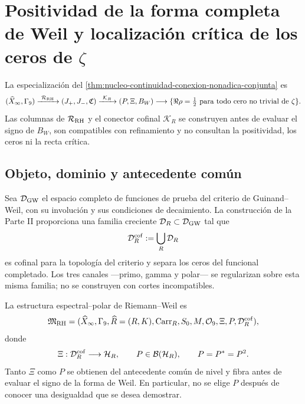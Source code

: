 \chapter[Positividad de Weil y localización crítica de los ceros de zeta]{Positividad de la forma completa de Weil y localización crítica de los ceros de \texorpdfstring{\(\zeta\)}{zeta}}

\noindent La especialización del
\cref{thm:nucleo-continuidad-conexion-nonadica-conjunta} es
\[
 (\widehat X_\infty,\Gamma_9)
 \xrightarrow{\ \mathcal R_{\rm RH}\ }
 (J_+,J_-,\mathfrak C)
 \xrightarrow{\ \mathcal K_R\ }
 (P,\Xi,B_W)
 \longrightarrow
 \{\Re\rho=\tfrac12\text{ para todo cero no trivial de }\zeta\}.
\]
Las columnas de \(\mathcal R_{\rm RH}\) y el conector cofinal
\(\mathcal K_R\) se construyen antes de evaluar el signo de \(B_W\), son
compatibles con refinamiento y no consultan la positividad, los ceros ni la
recta crítica.

\section*{Objeto, dominio y antecedente común}

Sea \(\mathcal D_{\rm GW}\) el espacio completo de funciones de prueba del
criterio de Guinand--Weil, con su involución y sus condiciones de decaimiento.
La construcción de la Parte II proporciona una familia creciente
\(\mathcal D_R\subset\mathcal D_{\rm GW}\) tal que
\begin{equation}\label{eq:realizaciones-rh-clase-cofinal}
 \mathcal D_R^{\rm cof}:=\bigcup_R\mathcal D_R
\end{equation}
es cofinal para la topología del criterio y separa los ceros del funcional
completado. Los tres canales ---primo, gamma y polar--- se regularizan sobre
esta misma familia; no se construyen con cortes incompatibles.

La estructura espectral--polar de Riemann--Weil es
\begin{equation}\label{eq:realizaciones-rh-estructura}
 \mathfrak M_{\rm RH}=
 (\widehat X_\infty,\Gamma_9,\widehat R=(R,K),
  \operatorname{Carr}_R,S_0,M,\mathcal O_9,
  \Xi,P,\mathcal D_R^{\rm cof}),
\end{equation}
donde
\begin{equation}\label{eq:realizaciones-rh-xi-p}
 \Xi:\mathcal D_R^{\rm cof}\longrightarrow\mathcal H_R,
 \qquad P\in\mathcal B(\mathcal H_R),
 \qquad P=P^*=P^2.
\end{equation}
Tanto \(\Xi\) como \(P\) se obtienen del antecedente común de nivel y fibra
antes de evaluar el signo de la forma de Weil. En particular, no se elige
\(P\) después de conocer una desigualdad que se desea demostrar.

